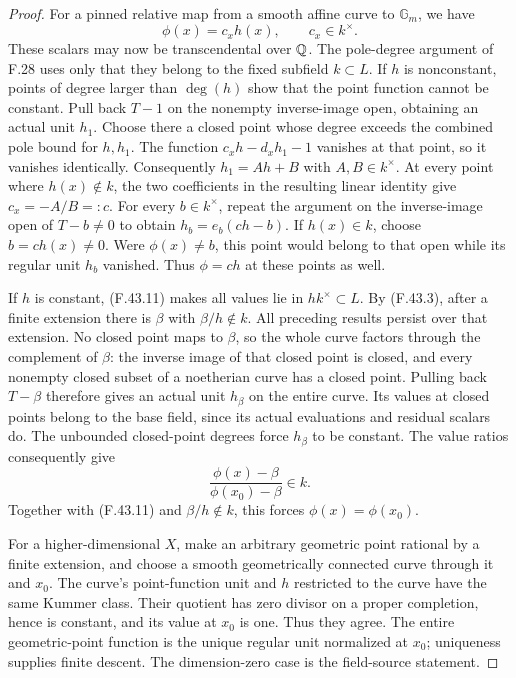 \begin{proof}
For a pinned relative map from a smooth
affine curve to $\mathbb G_m$, we have
\[
                  \phi(x)=c_xh(x),\qquad c_x\in k^\times.
                                                               \tag{F.43.11}
\]
These scalars may now be transcendental
over $\mathbb Q$. The pole-degree argument of
F.28 uses only that they belong to the
fixed subfield $k\subset L$.
If $h$ is nonconstant, points of degree
larger than $\deg(h)$ show that the
point function cannot be constant.
Pull back $T-1$ on the nonempty
inverse-image open, obtaining an actual
unit $h_1$. Choose there a closed point
whose degree exceeds the combined pole
bound for $h,h_1$. The function
$c_xh-d_xh_1-1$ vanishes at that point,
so it vanishes identically. Consequently
$h_1=Ah+B$ with $A,B\in k^\times$.
At every point where $h(x)\notin k$,
the two coefficients in the resulting
linear identity give
$c_x=-A/B=:c$.
For every $b\in k^\times$, repeat the
argument on the inverse-image open of
$T-b\ne0$ to obtain
$h_b=e_b(ch-b)$.
If $h(x)\in k$, choose $b=ch(x)\ne0$.
Were $\phi(x)\ne b$, this point would
belong to that open while its regular
unit $h_b$ vanished. Thus $\phi=ch$
at these points as well.

If $h$ is constant, (F.43.11) makes
all values lie in $hk^\times\subset L$.
By (F.43.3), after a finite extension
there is $\beta$ with $\beta/h\notin k$.
All preceding results persist over that
extension. No closed point maps to
$\beta$, so the whole curve factors
through the complement of $\beta$:
the inverse image of that closed point
is closed, and every nonempty closed
subset of a noetherian curve has a
closed point. Pulling back $T-\beta$
therefore gives an actual unit
$h_\beta$ on the entire curve.
Its values at closed points belong to
the base field, since its actual
evaluations and residual scalars do.
The unbounded closed-point degrees
force $h_\beta$ to be constant.
The value ratios consequently give
\[
              \frac{\phi(x)-\beta}
                   {\phi(x_0)-\beta}\in k.
\]
Together with (F.43.11) and
$\beta/h\notin k$, this forces
$\phi(x)=\phi(x_0)$.

For a higher-dimensional $X$, make
an arbitrary geometric point rational
by a finite extension, and choose a
smooth geometrically connected curve
through it and $x_0$. The curve's
point-function unit and $h$ restricted
to the curve have the same Kummer
class. Their quotient has zero divisor
on a proper completion, hence is
constant, and its value at $x_0$ is
one. Thus they agree. The entire
geometric-point function is the unique
regular unit normalized at $x_0$;
uniqueness supplies finite descent.
The dimension-zero case is the
field-source statement.


\end{proof}

